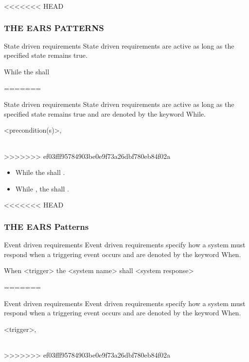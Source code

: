 \documentclass[aspectratio=169]{beamer}
\begin{document}
\begin{frame}[fragile]
<<<<<<< HEAD
\begin{frame}[fragile]
  \frametitle{THE EARS PATTERNS}
  \begin{block}{State driven requirements}
  State driven requirements are active as long as the specified state remains true.
    \begin{center}
      While {\color{orange}{$<$pre-condition(s)$>$}} the {\color{red}{$<$system name$>$}} shall {\color{blue}{$<$system response$>$}}
    \end{center}  
  \end{block}
=======
\begin{slide}{State driven requirements}
  State driven requirements are active as long as the specified state remains true and are denoted by the keyword While.
    \begin{block}{}
      \ewhile <precondition(s)>,\\
        \\
    \end{block}  
>>>>>>> ef03fff95784903be0e9f73a26dbf780eb84f02a
  
  \begin{example}
  \begin{itemize}
    \item While {\color{orange}{there is no card in the ATM}} the {\color{red}{ATM}} shall {\color{blue}{display "insert card to begin"}}.
    \item While {\color{orange}{in maintenance mode}}, the {\color{red}{kitchen system}} shall {\color{blue}{reject all input}}.
  \end{itemize}
  \end{example}

\end{slide}

<<<<<<< HEAD
\begin{frame}[fragile]
  \frametitle{THE EARS Patterns}
  \begin{block}{Event driven requirements}
  Event driven requirements specify how a system must respond when a triggering event occurs and are denoted by the keyword When.
    \begin{center}
      When <trigger> the <system name> shall <system response>
    \end{center}
  \end{block}
=======
\begin{slide}{Event driven requirements}
  Event driven requirements specify how a system must respond when a triggering event occurs and are denoted by the keyword When.
    \begin{block}{}
      \ewhen <trigger>, \\
         \\
    \end{block}
>>>>>>> ef03fff95784903be0e9f73a26dbf780eb84f02a
  

\end{slide}
\end{frame}
\end{frame}
\end{frame}
\end{document}

